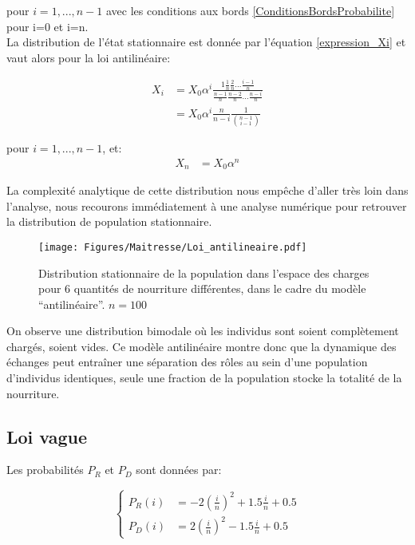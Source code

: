 pour $i=1,...,n-1$ avec les conditions aux bords \ref{ConditionsBordsProbabilite} pour i=0 et i=n.\\

La distribution de l'état stationnaire est donnée par l'équation \ref{expression_Xi} et vaut alors pour la loi antilinéaire:

\begin{equation}
\begin{aligned}
X_i&=X_0 \alpha^i \frac{1\frac{1}{n}\frac{2}{n}...\frac{i-1}{n}}{\frac{n-1}{n}\frac{n-2}{n}...\frac{n-i}{n}}\\
&=X_0 \alpha^i \frac{n}{n-i}\frac{1}{\binom{n-1}{i-1}}
\end{aligned}
\end{equation}

pour $i=1,...,n-1$, et:
\begin{equation}
\begin{aligned}
X_n&=X_0 \alpha^n
\end{aligned}
\end{equation}

La complexité analytique de cette distribution nous empêche d'aller très loin dans l'analyse, nous recourons immédiatement à une analyse numérique pour retrouver la distribution de population stationnaire.


\begin{figure}[h]
\centering
\texttt{[image: Figures/Maitresse/Loi\_antilineaire.pdf]}
\caption{Distribution stationnaire de la population dans l'espace des charges pour 6 quantités de nourriture différentes, dans le cadre du modèle ``antilinéaire''. $n=100$}
\label{DistribAnalytiqueAnti}
\end{figure}

On observe une distribution bimodale où les individus sont soient complètement chargés, soient vides. Ce modèle antilinéaire montre donc que la dynamique des échanges peut entraîner une séparation des rôles au sein d'une population d'individus identiques, seule une fraction de la population stocke la totalité de la nourriture.


\subsection{Loi vague}
Les probabilités $P_R$ et $P_D$ sont données par:

\begin{equation}
\left \{
\begin{aligned}
P_R(i) &= -2(\frac{i}{n})^2+1.5\frac{i}{n}+0.5\\
P_D(i) &= 2(\frac{i}{n})^2-1.5\frac{i}{n}+0.5
\end{aligned}
\right.
\end{equation}

